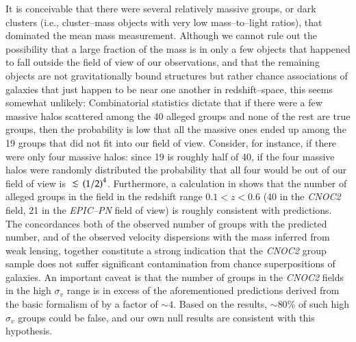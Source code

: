 It is conceivable that there were several relatively massive groups,
or dark clusters (i.e., cluster--mass objects with very low
mass--to--light ratios), that dominated the mean mass measurement.
Although we cannot rule out the possibility that a large fraction of
the mass is in only a few objects that happened to fall outside the
field of view of our observations, and that the remaining objects are
not gravitationally bound structures but rather chance associations of
galaxies that just happen to be near one another in redshift--space,
this seems somewhat unlikely: Combinatorial statistics dictate that if
there were a few massive halos scattered among the 40 alleged groups
and none of the rest are true groups, then the probability is low that
all the massive ones ended up among the 19 groups that did not fit
into our field of view.  Consider, for instance, if there were only
four massive halos: since 19 is roughly half of 40, if the four
massive halos were randomly distributed the probability that all four
would be out of our field of view is $\lsim\left(1/2\right)^4$.
Furthermore, a calculation in \citet{carlberg2001gg} shows that the
number of alleged groups in the field in the redshift range
$0.1<z<0.6$ (40 in the \textsl{CNOC2} field, 21 in the
\textsl{EPIC--PN} field of view) is roughly consistent with
predictions.  The concordances both of the observed number of groups
with the predicted number, and of the observed velocity dispersions
with the mass inferred from weak lensing, together constitute a strong
indication that the \textsl{CNOC2} group sample does not suffer
significant contamination from chance superpositions of galaxies.  An
important caveat is that the number of groups in the \textsl{CNOC2}
fields in the high $\sigma_v$ range is in excess of the aforementioned
predictions derived from the basic formalism of
\citet{press+schecter1974} by a factor of $\sim 4$.  Based on the
\citet{carlberg2001eg} results, $\sim 80\%$ of such high $\sigma_v$
groups could be false, and our own null results are consistent with
this hypothesis.

